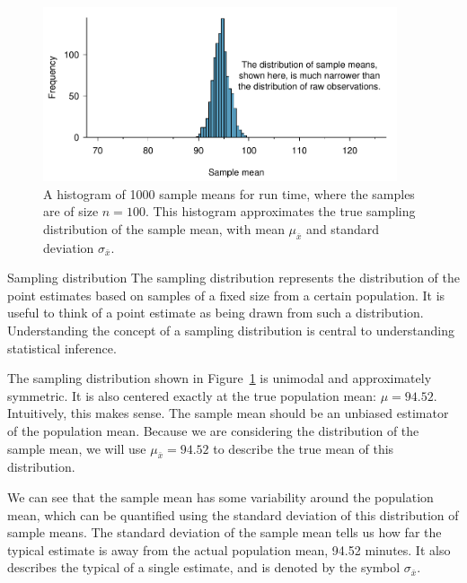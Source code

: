 \begin{figure}
   \centering
   \includegraphics[width=0.93\textwidth]{ch_distributions/figures/netTime1000SamplingDistribution/netTime1000SamplingDistribution}
   \caption{A histogram of 1000 sample means for run time, where the samples are of size $n=100$. This histogram approximates the true sampling distribution of the sample mean, with mean $\mu_{\bar{x}}$ and standard deviation $\sigma_{\bar{x}}$.}
   \label{netTime1000SamplingDistribution}
\end{figure}

\begin{onebox}{Sampling distribution}
The sampling distribution represents the distribution of the point estimates based on samples of a fixed size from a certain population. It is useful to think of a point estimate as being drawn from such a distribution. Understanding the concept of a sampling distribution is central to understanding statistical inference.\end{onebox}


The sampling distribution shown in Figure~\ref{netTime1000SamplingDistribution} is unimodal and approximately symmetric. It is also centered exactly at the true population mean: $\mu=94.52$. Intuitively, this makes sense. The sample mean should be an unbiased estimator of the population mean. Because we are considering the distribution of the sample mean, we will use $\mu_{\bar{x}} = 94.52$ to describe the true mean of this distribution.

We can see that the sample mean has some variability around the population mean, which can be quantified using the standard deviation of this distribution of sample means. The standard deviation of the sample mean tells us how far the typical estimate is away from the actual population mean, 94.52 minutes. It also describes the typical  of a single estimate, and is denoted by the symbol $\sigma_{\bar{x}}$. 

